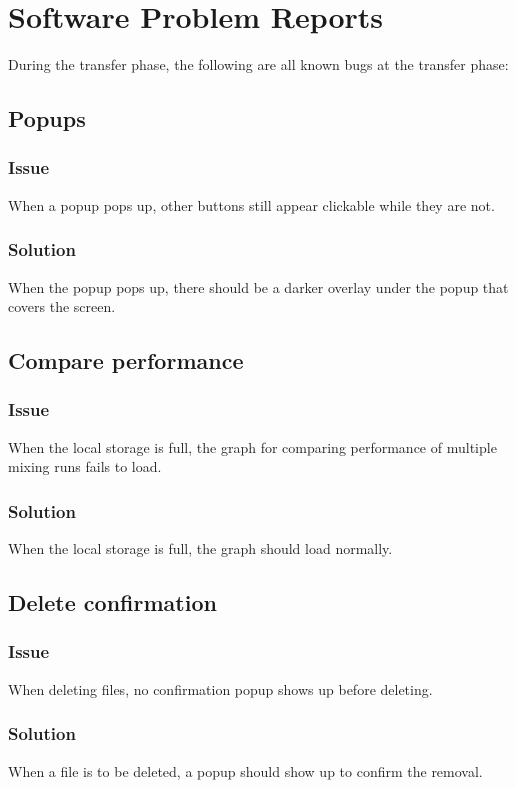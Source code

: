 \chapter{Software Problem Reports}
\label{chap:problems}

During the transfer phase, the following are all known bugs at the transfer phase:

\section{Popups}

\subsection*{Issue}
When a popup pops up, other buttons still appear clickable while they are not.

\subsection*{Solution}
When the popup pops up, there should be a darker overlay under the popup that covers the screen.

\section{Compare performance}

\subsection*{Issue}
When the local storage is full, the graph for comparing performance of multiple mixing runs fails to load.

\subsection*{Solution}
When the local storage is full, the graph should load normally.

\section{Delete confirmation}

\subsection*{Issue}
When deleting files, no confirmation popup shows up before deleting.

\subsection*{Solution}
When a file is to be deleted, a popup should show up to confirm the removal.


